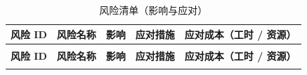 \begin{longtable}{>{\centering\arraybackslash}m{1cm} >{\centering\arraybackslash}m{1.7cm} >{\centering\arraybackslash}m{2.8cm} >{\centering\arraybackslash}m{5.2cm} >{\centering\arraybackslash}m{2.5cm}}

    \caption{风险清单（影响与应对）} \label{tab:training}                                                                                                                                                                          \\

    \toprule
    \textbf{风险 ID} & \textbf{风险名称}        & \textbf{影响}                                  & \textbf{应对措施}                                                                                     & \textbf{应对成本（工时 / 资源）}   \\
    \midrule
    \endfirsthead

    \multicolumn{5}{c}{{\tablename\ \thetable{} 续表}}                                                                                                                                                                    \\
    \toprule
    \textbf{风险 ID} & \textbf{风险名称}        & \textbf{影响}                                  & \textbf{应对措施}                                                                                     & \textbf{应对成本（工时 / 资源）}   \\
    \midrule
    \endhead

    \bottomrule
    \endfoot



\end{longtable}
